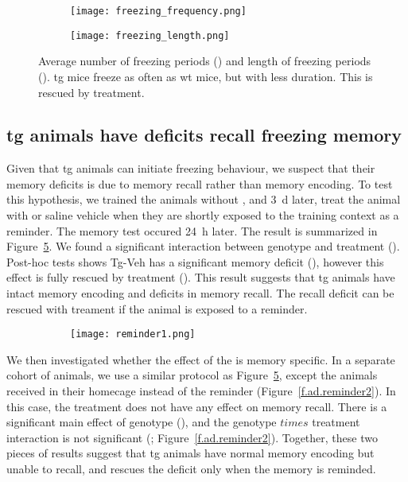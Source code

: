 \begin{figure}[h]
    \begin{subfigure}[h]{\textwidth}
        \texttt{[image: freezing\_frequency.png]}
        \caption{\label{f.ad.freezing_freq}}
    \end{subfigure}
    \begin{subfigure}[h]{\textwidth}
        \texttt{[image: freezing\_length.png]}
        \caption{\label{f.ad.freezing_length}}
    \end{subfigure}
    \caption{Average number of freezing periods () and length of freezing periods (). \Gls{tg} mice freeze as often as \gls{wt} mice, but with less duration. This is rescued by \tglu treatment. \label{f.ad.freezing_profile}}
\end{figure}




\subsection{\Gls{tg} animals have deficits recall freezing memory}
Given that \gls{tg} animals can initiate freezing behaviour, we suspect that their memory deficits is due to memory recall rather than memory encoding. To test this hypothesis, we trained the animals without \tglu, and \SI{3}{\day} later, treat the animal with \tglu or saline vehicle when they are shortly exposed to the training context as a reminder. The memory test occured \SI{24}{\hour} later. The result is summarized in Figure~\ref{f.ad.reminder1}. We found a significant interaction between genotype and treatment (). Post-hoc tests shows Tg-Veh has a significant memory deficit (), however this effect is fully rescued by \tglu treatment (). This result suggests that \gls{tg} animals have intact memory encoding and deficits in memory recall. The recall deficit can be rescued with \tglu treament if the animal is exposed to a reminder.

\begin{figure}[h]
    \begin{subfigure}[h]{\textwidth}
        \texttt{[image: reminder1.png]}
        \caption{\label{f.ad.actf}}
    \end{subfigure}
    \caption{ \label{f.ad.reminder1}}
\end{figure}

We then investigated whether the effect of the \tglu is memory specific. In a separate cohort of animals, we use a similar protocol as Figure~\ref{f.ad.reminder1}, except the animals received \tglu in their homecage instead of the reminder (Figure~\ref{f.ad.reminder2}). In this case, the \tglu treatment does not have any effect on memory recall. There is a significant main effect of genotype (), and the genotype $times$ treatment interaction is not significant (; Figure~\ref{f.ad.reminder2}). Together, these two pieces of results suggest that \gls{tg} animals have normal memory encoding but unable to recall, and \tglu rescues the deficit only when the memory is reminded.



